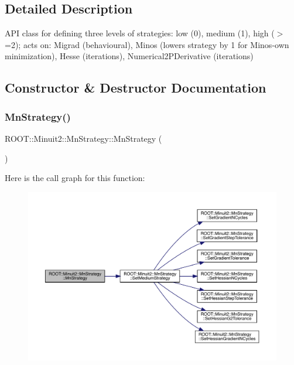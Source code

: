 \subsection{Detailed Description}
A\+PI class for defining three levels of strategies\+: low (0), medium (1), high ($>$=2); acts on\+: Migrad (behavioural), Minos (lowers strategy by 1 for Minos-\/own minimization), Hesse (iterations), Numerical2\+P\+Derivative (iterations) 

\subsection{Constructor \& Destructor Documentation}
\mbox{\label{classROOT_1_1Minuit2_1_1MnStrategy_a231337ee8aec47874370bc4b64683374}} 
\subsubsection{\texorpdfstring{MnStrategy()}{MnStrategy()}\hspace{0.1cm}{\footnotesize\ttfamily [1/6]}}
{\footnotesize\ttfamily R\+O\+O\+T\+::\+Minuit2\+::\+Mn\+Strategy\+::\+Mn\+Strategy (\begin{DoxyParamCaption}{ }\end{DoxyParamCaption})}

Here is the call graph for this function\+:\nopagebreak
\begin{figure}[H]
\begin{center}
\leavevmode
\includegraphics[width=350pt]{da/de4/classROOT_1_1Minuit2_1_1MnStrategy_a231337ee8aec47874370bc4b64683374_cgraph}
\end{center}
\end{figure}
\mbox{\label{classROOT_1_1Minuit2_1_1MnStrategy_ad70367966dc3b7cdf1be671acb3824d0}} 
